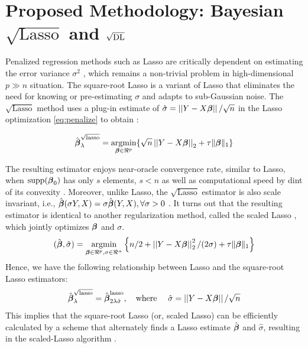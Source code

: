 \documentclass[10pt]{article}
\def\sql{$\sqrt{\text{Lasso}}$}
\begin{document}

\section{Proposed Methodology: Bayesian \texorpdfstring{$\sqrt{\text{Lasso}}$}{Square-root Lasso} and \texorpdfstring{$\sqrt{\text{\rm{DL}}}$}{Square-root DL} }\label{ch:2}

Penalized regression methods such as Lasso are critically dependent on estimating the error variance $\sigma^2$ , which remains a non-trivial problem in high-dimensional $p \gg n$ situation. The square-root Lasso \citep{belloni2011square} is a variant of Lasso that eliminates the need for knowing or pre-estimating $\sigma$ and adapts to sub-Gaussian noise. The $\sqrt{\text{Lasso}}$ method uses a plug-in estimate of $\hat \sigma = \left|\left|Y-X\boldsymbol{\beta}\right|\right|/\sqrt{n}$ in the Lasso optimization \eqref{eq:penalize} to obtain : 

\[
\hat{\bbeta}_{\lambda}^{\sqrt{\text{lasso}}} = \argmin_{\bbeta \in \Re^p} \{ \sqrt{n} \vectornorm{Y - X\bbeta}_2 + \tau \norm{\bbeta}_1 \} 
\]

The resulting estimator enjoys near-oracle convergence rate, similar to Lasso, when $\text{supp}(\boldsymbol{\beta}_0)$ has only $s$ elements, $s < n$ as well as computational speed by dint of its convexity \citep{belloni2011square}. Moreover, unlike Lasso, the \sql{} estimator is also scale invariant, i.e., $\hat{\boldsymbol{\beta}}(\sigma Y, X) = \sigma \hat{\boldsymbol{\beta}}(Y, X), \forall \sigma > 0$ \citep{giraud2014introduction}. It turns out that the resulting estimator is identical to another regularization method, called the scaled Lasso \citep{sun2012scaled}, which jointly optimizes $\boldsymbol{\beta}$ and $\sigma$. 
\[
(\hat{\bbeta},\hat{\sigma}) = \argmin_{\bbeta \in \Re^p, \sigma \in \Re^+} \left\{ n/2 + \vectornorm{Y-X\bbeta}_2^2 / (2\sigma) + \tau \norm{\bbeta}_1 \right\}
\]
Hence, we have the following relationship between Lasso and the square-root Lasso estimators:
\[
\hat{\boldsymbol{\beta}}_{\lambda}^{\sqrt{\text{lasso}}} = \hat{\boldsymbol{\beta}}_{2\lambda \hat{\sigma}}^{\text{lasso}}, \quad \text{where } \quad \hat{\sigma} = \left|\left|Y-X\boldsymbol{\beta}\right|\right|/\sqrt{n}
\]
This implies that the square-root Lasso (or, scaled Lasso) can be efficiently calculated by a scheme that alternately finds a Lasso estimate $\hat{\boldsymbol{\beta}}$ and $\hat{\sigma}$, resulting in the scaled-Lasso algorithm \citep{sun2012scaled}.  
\end{document}
